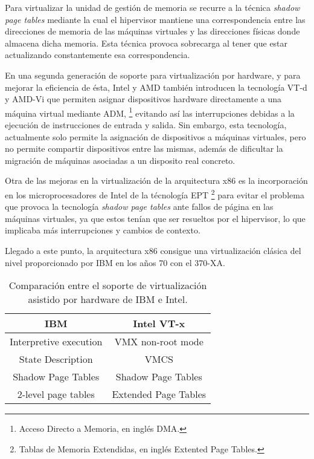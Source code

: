 \documentclass[spanisheDIVcalc,twoside,parskip-,pointlessnumbers,final]{scrbook}
\begin{document}
Para virtualizar la unidad de gestión de memoria se recurre a la técnica
\emph{shadow page tables }mediante la cual el hipervisor mantiene
una correspondencia entre las direcciones de memoria de las máquinas
virtuales y las direcciones físicas donde almacena dicha memoria.
Esta técnica provoca sobrecarga al tener que estar actualizando constantemente
esa correspondencia.

En una segunda generación de soporte para virtualización por hardware,
y para mejorar la eficiencia de ésta, Intel y AMD también introducen
la tecnología VT-d y AMD-Vi que permiten asignar dispositivos hardware
directamente a una máquina virtual mediante ADM,%
\footnote{Acceso Directo a Memoria, en inglés DMA.%
} evitando así las interrupciones debidas a la ejecución de instrucciones
de entrada y salida. Sin embargo, esta tecnología, actualmente solo
permite la asignación de dispositivos a máquinas virtuales, pero no
permite compartir dispositivos entre las mismas,
además de dificultar la migración de máquinas asociadas a un disposito
real concreto.

Otra de las mejoras en la virtualización de la arquitectura x86 es
la incorporación en los microprocesadores de Intel de la técnología
EPT%
\footnote{Tablas de Memoria Extendidas, en inglés Extented Page Tables.%
} para evitar el problema que provoca la tecnología \emph{shadow page
tables }ante fallos de página en las máquinas virtuales, ya que estos
tenían que ser resueltos por el hipervisor, lo que implicaba más interrupciones
y cambios de contexto.

Llegado a este punto, la arquitectura x86 consigue una virtualización
clásica del nivel proporcionado por IBM en los años 70 con el 370-XA.

\begin{table}[htpb]
\begin{centering}
\begin{tabular}{|c|c|}
\hline 
\textbf{IBM} & \textbf{Intel VT-x}\tabularnewline
\hline 
\hline 
Interpretive execution & VMX non-root mode\tabularnewline
\hline 
State Description & VMCS\tabularnewline
\hline 
Shadow Page Tables & Shadow Page Tables\tabularnewline
\hline 
2-level page tables & Extended Page Tables\tabularnewline
\hline 
\end{tabular}
\par\end{centering}

\caption{Comparación entre el soporte de virtualización asistido por hardware
de IBM e Intel.}
\label{IBM virt VS Intel virt}
\end{table}
\end{document}
